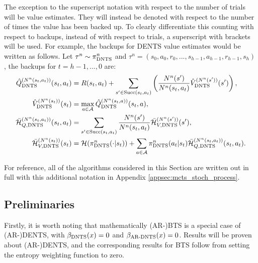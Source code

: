     The exception to the superscript notation with respect to the number of trials will be value estimates. They will instead be denoted with respect to the number of times the value has been backed up. To clearly differentiate this counting with respect to backups, instead of with respect to trials, a superscript with brackets will be used. For example, the backups for DENTS value estimates would be written as follows. Let $\tau^n \sim {\pi^{n}_{{\textnormal{DNTS}}}}$ and $\tau^n=(s_0,a_0,r_0,...,s_{h-1},a_{h-1},r_{h-1},s_{h})$, the backups for $t=h-1,...,0$ are: 
    \begin{align}
        {\hat{Q}^{(N^n(s_t,a_t))}_{{\textnormal{DNTS}}}}(s_t,a_t) &= 
            R(s_t,a_t) + \sum_{s' \in {\textnormal{Succ}(s_t,a_t)}} \left( 
                \frac{N^n(s')}{N^n(s_t,a_t)} {\hat{V}^{(N^n(s'))}_{{\textnormal{DNTS}}}}(s') \right), 
            \label{appeq:dp_q_backup} \\ 
        {\hat{V}^{(N^n(s_t))}_{{\textnormal{DNTS}}}}(s_t) &=\max_{a\in\mathcal{A}} {\hat{Q}^{(N^n(s_t,a))}_{{\textnormal{DNTS}}}}(s_t,a), 
            \label{appeq:dp_v_backup} \\
        {\bar{\mathcal{H}}^{(N^n(s_t,a_t))}_{Q,{\textnormal{DNTS}}}}(s_t,a_t) &= 
            \sum_{s'\in {\textnormal{Succ}(s_t,a_t)}} \frac{N^n(s')}{N^n(s_t,a_t)} {\bar{\mathcal{H}}^{(N^n(s'))}_{V,{\textnormal{DNTS}}}}(s'), \\
        {\bar{\mathcal{H}}^{(N^n(s_t))}_{V,{\textnormal{DNTS}}}}(s_t) &= 
            \mathcal{H}({\pi^{n}_{{\textnormal{DNTS}}}}(\cdot | s_t)) 
                + \sum_{a\in\mathcal{A}} {\pi^{n}_{{\textnormal{DNTS}}}}(a_t|s_t){\bar{\mathcal{H}}^{(N^n(s_t,a_t))}_{Q,{\textnormal{DNTS}}}}(s_t,a_t).
    \end{align}
    
    For reference, all of the algorithms considered in this Section are written out in full with this additional notation in Appendix \ref{appsec:mcts_stoch_process}.















    \subsection{Preliminaries}
    \label{sec:4-5-2-prelim}

        Firstly, it is worth noting that mathematically (AR-)BTS is a special case of (AR-)DENTS, with ${\beta_{{\textnormal{DNTS}}}}(x)=0$ and ${\beta_{{\textnormal{AR-DNTS}}}}(x)=0$. Results will be proven about (AR-)DENTS, and the corresponding results for BTS follow from setting the entropy weighting function to zero.





